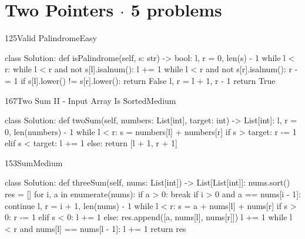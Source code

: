\section{Two Pointers \texorpdfstring{{\normalsize\color{muted}$\cdot$ 5 problems}}{- 5 problems}}

\begin{problem}{125}{Valid Palindrome}{Easy}
\begin{code}
class Solution:
    def isPalindrome(self, s: str) -> bool:
        l, r = 0, len(s) - 1
        while l < r:
            while l < r and not s[l].isalnum():
                l += 1
            while l < r and not s[r].isalnum():
                r -= 1
            if s[l].lower() != s[r].lower():
                return False
            l, r = l + 1, r - 1
        return True
\end{code}
\end{problem}

\begin{problem}{167}{Two Sum II - Input Array Is Sorted}{Medium}
\begin{code}
class Solution:
    def twoSum(self, numbers: List[int], target: int) -> List[int]:
        l, r = 0, len(numbers) - 1
        while l < r:
            s = numbers[l] + numbers[r]
            if s > target:
                r -= 1
            elif s < target:
                l += 1
            else:
                return [l + 1, r + 1]
\end{code}
\end{problem}

\begin{problem}{15}{3Sum}{Medium}
\begin{code}
class Solution:
    def threeSum(self, nums: List[int]) -> List[List[int]]:
        nums.sort()
        res = []
        for i, a in enumerate(nums):
            if a > 0:
                break
            if i > 0 and a == nums[i - 1]:
                continue
            l, r = i + 1, len(nums) - 1
            while l < r:
                s = a + nums[l] + nums[r]
                if s > 0:
                    r -= 1
                elif s < 0:
                    l += 1
                else:
                    res.append([a, nums[l], nums[r]])
                    l += 1
                    while l < r and nums[l] == nums[l - 1]:
                        l += 1
        return res
\end{code}
\end{problem}

